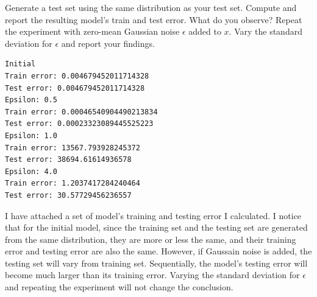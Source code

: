 \documentclass[a4paper]{article}
\theoremstyle{definition}
\begin{document}
Generate a test set using the same distribution as your test set. Compute and report the resulting model’s train and test error. What do you observe?
Repeat the experiment with zero-mean Gaussian noise $\epsilon$ added to $x$. Vary the standard deviation for $\epsilon$ and report your findings.

{\color{blue}
\begin{verbatim}
Initial
Train error: 0.004679452011714328
Test error: 0.004679452011714328
Epsilon: 0.5
Train error: 0.00046540904490213834
Test error: 0.00023323089445525223
Epsilon: 1.0
Train error: 13567.793928245372
Test error: 38694.61614936578
Epsilon: 4.0
Train error: 1.2037417284240464
Test error: 30.57729456236557
\end{verbatim}

I have attached a set of model's training and testing error I calculated. I notice that for the initial model, since the training set and the testing set are generated from the same distribution, they are more or less the same, and their training error and testing error are also the same. However, if Gaussain noise is added, the testing set will vary from training set. Sequentially, the model's testing error will become much larger than its training error. Varying the standard deviation for $\epsilon$ and repeating the experiment will not change the conclusion.
}


\end{document}
